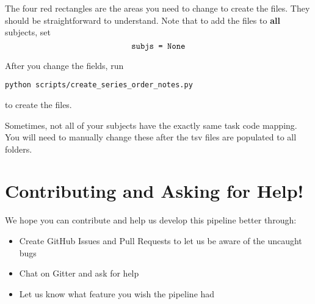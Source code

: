 \documentclass[12pt]{myland}
\def\<#1>{\texttt{#1}}
\begin{document}
The four red rectangles are the areas you need to change to create the files. They should be 
straightforward to understand. Note that to add the files to \textbf{all} subjects, set
\[\text{\<subjs = None>}\]

After you change the fields, run
    \begin{lstlisting}[xleftmargin=.2\textwidth, xrightmargin=.2\textwidth, backgroundcolor=\color{lightgray}]
    python scripts/create_series_order_notes.py
    \end{lstlisting}        
to create the files. \par

Sometimes, not all of your subjects have the exactly same task code mapping. You will need to manually
change these after the tsv files are populated to all folders.


\section{Contributing and Asking for Help!}
We hope you can contribute and help us develop this pipeline better through:
\begin{itemize}
    \item Create GitHub Issues and Pull Requests to let us be aware of the uncaught bugs
    \item Chat on Gitter and ask for help
    \item Let us know what feature you wish the pipeline had 
\end{itemize}
\end{document}
